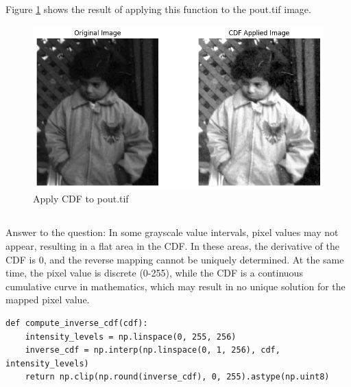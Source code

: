 \documentclass[12pt]{article}
\begin{document}
Figure \ref{fig:4.2} shows the result of applying this function to the pout.tif image.
\begin{figure}[ht]
        \centering
            \includegraphics[width=0.7\columnwidth, keepaspectratio]{pics/a2-4.2}
        \caption[]{Apply CDF to pout.tif}
    \label{fig:4.2}
    \end{figure}

\subsection{}

Answer to the question:
In some grayscale value intervals, pixel values may not appear, resulting in a flat area in the CDF. In these areas, the derivative of the CDF is 0, and the reverse mapping cannot be uniquely determined. At the same time, the pixel value is discrete (0-255), while the CDF is a continuous cumulative curve in mathematics, which may result in no unique solution for the mapped pixel value.

\begin{lstlisting}[caption={Compute Inverse CDF},captionpos=b]
def compute_inverse_cdf(cdf):
    intensity_levels = np.linspace(0, 255, 256)
    inverse_cdf = np.interp(np.linspace(0, 1, 256), cdf, intensity_levels)
    return np.clip(np.round(inverse_cdf), 0, 255).astype(np.uint8)

\end{lstlisting}

\subsection{}
\end{document}
